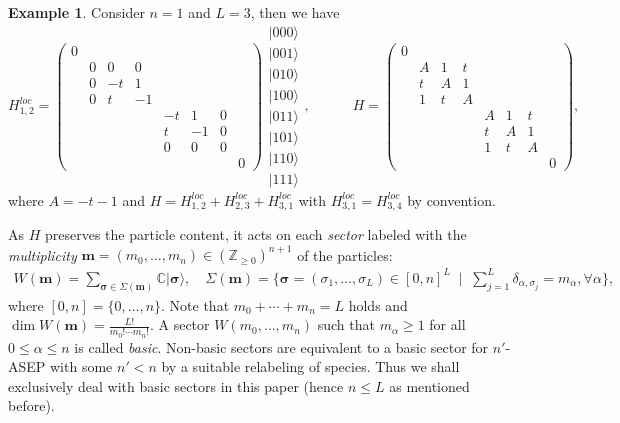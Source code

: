 \documentclass[11pt]{article}
\theoremstyle{definition}
\newtheorem{exam}[theo]{Example}
\numberwithin{equation}{section}
\newcommand{\Z}{{\mathbb Z}}
\newcommand{\ket}[1]{\lvert #1 \rangle}
\newcommand{\mm}{\mathbf{m}}
\newcommand{\defn}[1]{{\color{blue}\emph{#1}}}
\begin{document}
\begin{exam}
Consider $n = 1$ and $L = 3$, then we have
\[
H^{loc}_{1,2} = \begin{pmatrix}
0
\\ & 0 & 0 & 0
\\ & 0 & -t & 1
\\ & 0 & t & -1
\\ &&&& -t & 1 & 0
\\ &&&& t & -1 & 0
\\ &&&& 0 & 0 & 0
\\ &&&&&&&0
\end{pmatrix}
\begin{matrix}
\ket{000} \\ \ket{001} \\ \ket{010} \\ \ket{100} \\ \ket{011} \\ \ket{101} \\ \ket{110} \\ \ket{111}
\end{matrix},
\qquad\quad
H = \begin{pmatrix}
0
\\ & A & 1 & t
\\ & t & A & 1
\\ & 1 & t & A
\\ &&&& A & 1 & t
\\ &&&& t & A & 1
\\ &&&& 1 & t & A
\\ &&&&&&&0
\end{pmatrix},
\]
where $A = -t-1$ and $H = H_{1,2}^{loc} + H_{2,3}^{loc} + H_{3,1}^{loc}$ with $H_{3,1}^{loc} = H_{3,4}^{loc}$ by convention.
\end{exam}

As $H$ preserves the particle content, 
it acts on each \defn{sector} labeled with 
the \defn{multiplicity} $\mm=(m_0, \ldots, m_n) \in (\Z_{\ge 0})^{n+1}$ of the particles:
\begin{align}\label{a:VP}
W(\mm) =\!\!
\sum_{{\boldsymbol \sigma} \in 
\Sigma(\mm)}\! \mathbb{C}\ket{{\boldsymbol \sigma}}, \quad
\Sigma(\mm) = 
\{{\boldsymbol \sigma}=(\sigma_1, \ldots, \sigma_L) \in [0,n]^L\; \mid \;
\sum_{j=1}^L \delta_{\alpha,\sigma_j} = m_\alpha,\forall \alpha\},
\end{align}
where $[0, n] = \{0, \ldots, n\}$.
Note that $m_0 + \cdots + m_n = L$ holds and $\dim W(\mm) = \frac{L!}{m_0! \cdots m_n!}$.
A sector $W(m_0,\ldots, m_n)$ such that $m_\alpha \ge 1$ for all $0 \le \alpha \le n$ is called \defn{basic}.
Non-basic sectors are equivalent to a basic sector for $n'$-ASEP with some $n' < n$ by a suitable relabeling of species.
Thus we shall exclusively deal with basic sectors in this paper
(hence $n \le L$ as mentioned before).
\end{document}
